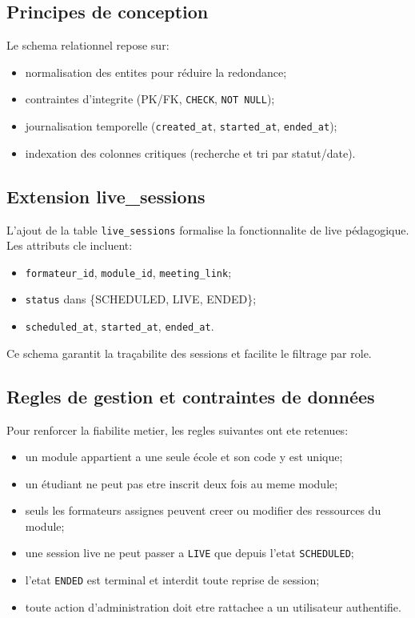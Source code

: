 \documentclass[12pt,a4paper,oneside]{report}
\begin{document}
\subsection{Principes de conception}

Le schema relationnel repose sur:
\begin{itemize}
  \item normalisation des entites pour réduire la redondance;
  \item contraintes d'integrite (PK/FK, \texttt{CHECK}, \texttt{NOT NULL});
  \item journalisation temporelle (\texttt{created\_at}, \texttt{started\_at}, \texttt{ended\_at});
  \item indexation des colonnes critiques (recherche et tri par statut/date).
\end{itemize}

\subsection{Extension live\_sessions}

L'ajout de la table \texttt{live\_sessions} formalise la fonctionnalite de live pédagogique.
Les attributs cle incluent:
\begin{itemize}
  \item \texttt{formateur\_id}, \texttt{module\_id}, \texttt{meeting\_link};
  \item \texttt{status} dans \{SCHEDULED, LIVE, ENDED\};
  \item \texttt{scheduled\_at}, \texttt{started\_at}, \texttt{ended\_at}.
\end{itemize}

Ce schema garantit la traçabilite des sessions et facilite le filtrage par role.

\subsection{Regles de gestion et contraintes de données}

Pour renforcer la fiabilite metier, les regles suivantes ont ete retenues:
\begin{itemize}
  \item un module appartient a une seule école et son code y est unique;
  \item un étudiant ne peut pas etre inscrit deux fois au meme module;
  \item seuls les formateurs assignes peuvent creer ou modifier des ressources du module;
  \item une session live ne peut passer a \texttt{LIVE} que depuis l'etat \texttt{SCHEDULED};
  \item l'etat \texttt{ENDED} est terminal et interdit toute reprise de session;
  \item toute action d'administration doit etre rattachee a un utilisateur authentifie.
\end{itemize}
\end{document}
